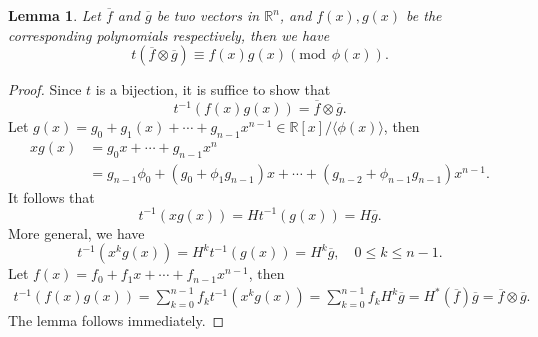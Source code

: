 \documentclass [11pt]{article}
\newtheorem{lem}[thm]{\bf Lemma}
\begin{document}
\begin{lem} \label{lm2.3}  Let $\overline{f}$ and $\overline{g}$ be two vectors in $\mathbb{R}^{n}$, and $f(x), g(x)$
be the corresponding polynomials respectively, then we have
 \begin{equation}\label{2.12}
  t(\overline{f} \otimes \overline{g}) \equiv f(x) g(x) (\text{mod}\ \  \phi(x)) .
\end{equation}
 \end{lem}
\begin{proof} Since $t$ is a bijection, it is suffice to show that
\begin{equation}\label{2.13}
t^{-1}(f(x) g(x))=\overline{f} \otimes \overline{g}.
\end{equation}
 Let $g(x)=g_{0}+g_{1} (x)+\cdots+g_{n-1} x^{n-1} \in \mathbb{R}[x] /\langle \phi(x)\rangle$, then
\begin{align*}
x g(x)&=g_{0} x+\cdots+g_{n-1}x^{n}\\
&=g_{n-1}\phi_{0}+(g_{0}+\phi_{1}g_{n-1} )x+\cdots +(g_{n-2}+\phi_{n-1}g_{n-1}  )x^{n-1}.
\end{align*}
It follows that
$$
t^{-1}(x g(x))=H t^{-1}(g(x))=H \overline{g}.
$$
More general, we have
\begin{equation}\label{2.13}
t^{-1}\left(x^{k} g(x)\right)=H^{k} t^{-1}(g(x))=H^{k}\overline{g},\quad 0 \leq  k \leq n-1.
\end{equation}
Let $f(x)=f_{0}+f_{1} x+\cdots+f_{n-1} x^{n-1}$, then
$$
\begin{aligned}
t^{-1}(f(x) g(x)) =\sum_{k=0}^{n-1} f_{k} t^{-1}\left(x^{k} g(x)\right) =\sum_{k=0}^{n-1} f_{k} H^{k} \overline{g} =H^{*}(\overline{f}) \overline{g}= \overline{f}\otimes \overline{g}.
\end{aligned}
$$
The lemma follows immediately.
\end{proof}
\end{document}
